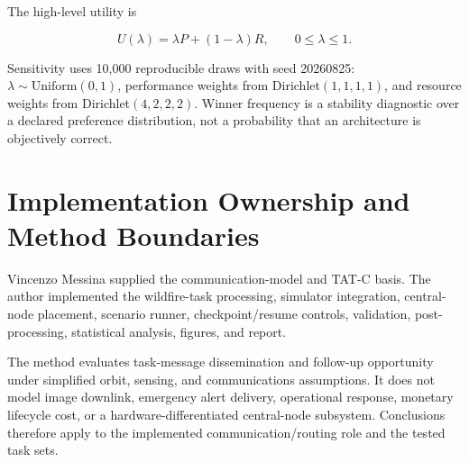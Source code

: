 The high-level utility is

\begin{equation}
U(\lambda)=\lambda P+(1-\lambda)R,\qquad 0\le\lambda\le1.
\end{equation}

Sensitivity uses 10,000 reproducible draws with seed 20260825: $\lambda\sim\mathrm{Uniform}(0,1)$, performance weights from Dirichlet$(1,1,1,1)$, and resource weights from Dirichlet$(4,2,2,2)$. Winner frequency is a stability diagnostic over a declared preference distribution, not a probability that an architecture is objectively correct.

\section{Implementation Ownership and Method Boundaries}

Vincenzo Messina supplied the communication-model and TAT-C basis. The author implemented the wildfire-task processing, simulator integration, central-node placement, scenario runner, checkpoint/resume controls, validation, post-processing, statistical analysis, figures, and report.

The method evaluates task-message dissemination and follow-up opportunity under simplified orbit, sensing, and communications assumptions. It does not model image downlink, emergency alert delivery, operational response, monetary lifecycle cost, or a hardware-differentiated central-node subsystem. Conclusions therefore apply to the implemented communication/routing role and the tested task sets.
